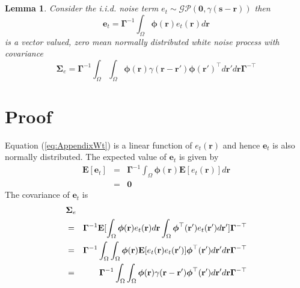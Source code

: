 \documentclass[12pt]{iopart}
\begin{document}
\section{}\label{ColoredNoise} 
\newtheorem{lemma}{Lemma} 
\begin{lemma}
	Consider the i.i.d. noise term $e_t\sim\mathcal{GP}(\mathbf 0,\gamma(\mathbf{s}-\mathbf{r}))$ then 
	\begin{equation}
		\mathbf e_t=\boldsymbol{\Gamma}^{-1}\int_\Omega {\boldsymbol{\phi} ( \mathbf{r} )e_t( \mathbf{r} )d\mathbf{r}} \label{eq:AppendixWt} 
	\end{equation}
	is a vector valued, zero mean normally distributed white noise process with covariance 
	\begin{equation}
		\boldsymbol\Sigma_e =\mathbf{\Gamma}^{-1}\int_{\Omega}\int_{\Omega}\boldsymbol{\phi}\left(\mathbf r\right) \gamma\left(\mathbf r- \mathbf r' \right)\boldsymbol{\phi}\left(\mathbf r'\right)^{\top}d\mathbf r' d\mathbf r\mathbf{\Gamma}^{- \top} 
	\end{equation}
	\label{lemma:FieldCovariance} 
\end{lemma}
\section*{Proof} Equation (\ref{eq:AppendixWt}) is a linear function of $e_t(\mathbf r)$ and hence $\mathbf{e}_t$ is also normally distributed. The expected value of $\mathbf e_t$ is given by 
\begin{eqnarray}
	\mathbf E\left[ \mathbf e_t\right]&=& \mathbf{\Gamma}^{-1}\int_{\Omega}\boldsymbol\phi\left(\mathbf{r}\right)\mathbf E\left[e_t\left(\mathbf{r}\right)\right] d\mathbf{r} \nonumber \\
	&=&\mathbf 0 
\end{eqnarray}
The covariance of $\mathbf{e}_t$ is 
\begin{eqnarray}
	\lefteqn{\mathbf{\Sigma}_e} \nonumber \\ 
&=&\mathbf{\Gamma}^{-1}\mathbf E[\int_{\Omega}\boldsymbol{\phi}(\mathbf{r})e_t(\mathbf{r})d\mathbf{r} \int_{\Omega}\boldsymbol{\phi}^{\top}(\mathbf{r}') e_t(\mathbf{r}')d\mathbf{r}']\mathbf{\Gamma}^{- \top} \nonumber \\
	&=&\mathbf{\Gamma}^{-1}\int_{\Omega}\int_{\Omega} \boldsymbol{\phi}(\mathbf{r}) \mathbf E[e_t(\mathbf{r})e_t(\mathbf{r}')]\boldsymbol{\phi}^{\top}(\mathbf{r}')d\mathbf{r}' d\mathbf r\mathbf{\Gamma}^{- \top} \nonumber\\
	&=&\mathbf{\Gamma}^{-1}\int_{\Omega}\int_{\Omega}\boldsymbol{\phi}(\mathbf r) \gamma(\mathbf r- \mathbf r' )\boldsymbol{\phi}^{\top}(\mathbf r')d\mathbf r' d\mathbf r\mathbf{\Gamma}^{-\top} 
\end{eqnarray}
\end{document}
